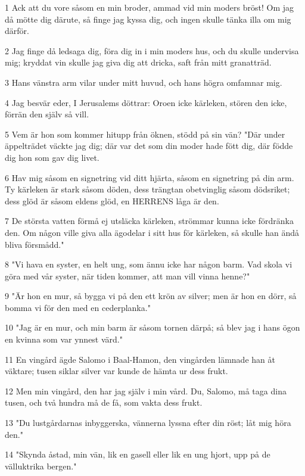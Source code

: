 \par 1 Ack att du vore såsom en min broder, ammad vid min moders bröst! Om jag då mötte dig därute, så finge jag kyssa dig, och ingen skulle tänka illa om mig därför.
\par 2 Jag finge då ledsaga dig, föra dig in i min moders hus, och du skulle undervisa mig; kryddat vin skulle jag giva dig att dricka, saft från mitt granatträd.
\par 3 Hans vänstra arm vilar under mitt huvud, och hans högra omfamnar mig.
\par 4 Jag besvär eder, I Jerusalems döttrar: Oroen icke kärleken, stören den icke, förrän den själv så vill.
\par 5 Vem är hon som kommer hitupp från öknen, stödd på sin vän? "Där under äppelträdet väckte jag dig; där var det som din moder hade fött dig, där födde dig hon som gav dig livet.
\par 6 Hav mig såsom en signetring vid ditt hjärta, såsom en signetring på din arm. Ty kärleken är stark såsom döden, dess trängtan obetvinglig såsom dödsriket; dess glöd är såsom eldens glöd, en HERRENS låga är den.
\par 7 De största vatten förmå ej utsläcka kärleken, strömmar kunna icke fördränka den. Om någon ville giva alla ägodelar i sitt hus för kärleken, så skulle han ändå bliva försmådd."
\par 8 "Vi hava en syster, en helt ung, som ännu icke har någon barm. Vad skola vi göra med vår syster, när tiden kommer, att man vill vinna henne?"
\par 9 "Är hon en mur, så bygga vi på den ett krön av silver; men är hon en dörr, så bomma vi för den med en cederplanka."
\par 10 "Jag är en mur, och min barm är såsom tornen därpå; så blev jag i hans ögon en kvinna som var ynnest värd."
\par 11 En vingård ägde Salomo i Baal-Hamon, den vingården lämnade han åt väktare; tusen siklar silver var kunde de hämta ur dess frukt.
\par 12 Men min vingård, den har jag själv i min vård. Du, Salomo, må taga dina tusen, och två hundra må de få, som vakta dess frukt.
\par 13 "Du lustgårdarnas inbyggerska, vännerna lyssna efter din röst; låt mig höra den."
\par 14 "Skynda åstad, min vän, lik en gasell eller lik en ung hjort, upp på de välluktrika bergen."


